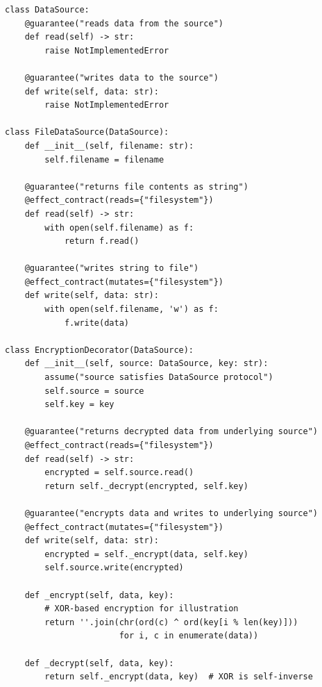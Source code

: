 \documentclass[11pt,a4paper]{report}
\theoremstyle{definition}
\theoremstyle{plain}
\begin{document}
\begin{lstlisting}[style=synhopy]
class DataSource:
    @guarantee("reads data from the source")
    def read(self) -> str:
        raise NotImplementedError

    @guarantee("writes data to the source")
    def write(self, data: str):
        raise NotImplementedError

class FileDataSource(DataSource):
    def __init__(self, filename: str):
        self.filename = filename

    @guarantee("returns file contents as string")
    @effect_contract(reads={"filesystem"})
    def read(self) -> str:
        with open(self.filename) as f:
            return f.read()

    @guarantee("writes string to file")
    @effect_contract(mutates={"filesystem"})
    def write(self, data: str):
        with open(self.filename, 'w') as f:
            f.write(data)

class EncryptionDecorator(DataSource):
    def __init__(self, source: DataSource, key: str):
        assume("source satisfies DataSource protocol")
        self.source = source
        self.key = key

    @guarantee("returns decrypted data from underlying source")
    @effect_contract(reads={"filesystem"})
    def read(self) -> str:
        encrypted = self.source.read()
        return self._decrypt(encrypted, self.key)

    @guarantee("encrypts data and writes to underlying source")
    @effect_contract(mutates={"filesystem"})
    def write(self, data: str):
        encrypted = self._encrypt(data, self.key)
        self.source.write(encrypted)

    def _encrypt(self, data, key):
        # XOR-based encryption for illustration
        return ''.join(chr(ord(c) ^ ord(key[i % len(key)]))
                       for i, c in enumerate(data))

    def _decrypt(self, data, key):
        return self._encrypt(data, key)  # XOR is self-inverse
\end{lstlisting}
\end{document}
